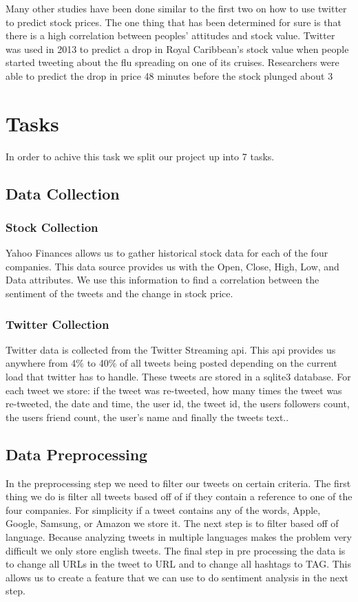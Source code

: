 \documentclass{acm_proc_article-sp}
\begin{document}
Many other studies have been done similar to the first two on how to use
twitter to predict stock prices. The one thing that has been determined for
sure is that there is a high correlation between peoples' attitudes and stock
value. Twitter was used in 2013 to predict a drop in Royal Caribbean's stock
value when people started tweeting about the flu spreading on one of its
cruises. Researchers were able to predict the drop in price 48 minutes before
the stock plunged about 3%

\section{Tasks}
In order to achive this task we split our project up into 7 tasks.

\subsection{Data Collection} 
\subsubsection{Stock Collection} 

Yahoo Finances allows us to gather historical stock data for each of the four
companies.  This data source provides us with the Open, Close, High, Low, and
Data attributes. We use this information to find a correlation between the
sentiment of the tweets and the change in stock price.

\subsubsection{Twitter Collection} 

Twitter data is collected from the Twitter Streaming api. This api provides us
anywhere from 4\% to 40\% of all tweets being posted depending on the current
load that twitter has to handle. These tweets are stored in a sqlite3 database.
For each tweet we store:  if the tweet was re-tweeted, how many times the tweet
was re-tweeted, the date and time, the user id, the tweet id, the users
followers count, the users friend count, the user's name and finally the tweets
text..

\subsection{Data Preprocessing}

In the preprocessing step we need to filter our tweets on certain criteria. The
first thing we do is filter all tweets based off of if they contain a reference
to one of the four companies. For simplicity if a tweet contains any of the
words, Apple, Google, Samsung, or Amazon we store it. The next step is to
filter based off of language. Because analyzing tweets in multiple languages
makes the problem very difficult we only store english tweets. The final step
in pre processing the data is to change all URLs in the tweet to URL and to
change all hashtags to TAG. This allows us to create a feature that we can use
to do sentiment analysis in the next step.
\end{document}
